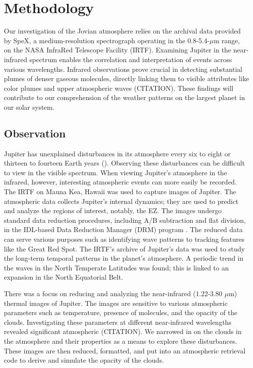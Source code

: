 \documentclass[a4paper,fleqn]{cas-dc}
\begin{document}
\section{Methodology}
Our investigation of the Jovian atmosphere relies on the archival data provided by SpeX, a medium-resolution spectrograph operating in the 0.8-5.4-$\mu$m range, on the NASA InfraRed Telescope Facility (IRTF). Examining Jupiter in the near-infrared spectrum enables the correlation and interpretation of events across various wavelengths. Infrared observations prove crucial in detecting substantial plumes of denser gaseous molecules, directly linking them to visible attributes like color plumes and upper atmospheric waves (CITATION). These findings will contribute to our comprehension of the weather patterns on the largest planet in our solar system.

\subsection{Observation}
Jupiter has unexplained disturbances in its atmosphere every six to eight or thirteen to fourteen Earth years (\citep{antunano2018infrared}). Observing these disturbances can be difficult to view in the visible spectrum. When viewing Jupiter’s atmosphere in the infrared, however, interesting atmospheric events can more easily be recorded. The IRTF on Mauna Kea, Hawaii was used to capture images of Jupiter. The atmospheric data collects Jupiter’s internal dynamics; they are used to predict and analyze the regions of interest, notably, the EZ. The images undergo standard data reduction procedures, including A/B subtraction and flat division, in the IDL-based Data Reduction Manager (DRM) program . The reduced data can serve various purposes such as identifying wave patterns to tracking features like the Great Red Spot. The IRTF's archive of Jupiter’s data was used to study the long-term temporal patterns in the planet's atmosphere. A periodic trend in the waves in the North Temperate Latitudes was found; this is linked to an expansion in the North Equatorial Belt.

There was a focus on reducing and analyzing the near-infrared (1.22-3.80 $\mu$m) thermal images of Jupiter. The images are sensitive to various atmospheric parameters such as temperature, presence of molecules, and the opacity of the clouds. Investigating these parameters at different near-infrared wavelengths revealed significant atmospheric (CITATION). We narrowed in on the clouds in the atmosphere and their properties as a means to explore these disturbances. These images are then reduced, formatted, and put into an atmospheric retrieval code to derive and simulate the opacity of the clouds. 
\end{document}

